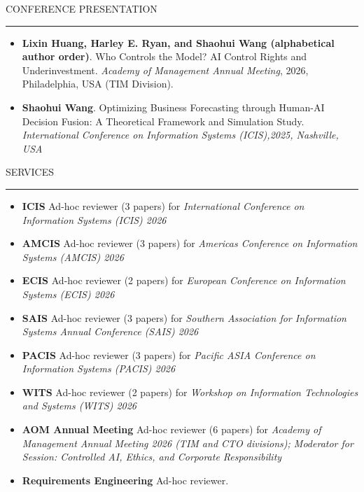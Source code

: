 \documentclass{resume}
\renewenvironment{rSection}[1]{
\Needspace{5\baselineskip}
\sectionskip
\textcolor{RoyalPurple}{\MakeUppercase{#1}}
\sectionlineskip
\hrule
\begin{list}{}{
\setlength{\leftmargin}{1.5em}
}
\item[]
}{
\end{list}
}
\begin{document}
\begin{rSection}{CONFERENCE PRESENTATION}
\begin{itemize}[leftmargin=0.7em]
    \item \textbf{Lixin Huang, Harley E. Ryan, and Shaohui Wang (alphabetical author order)}. Who Controls the Model? AI Control Rights and Underinvestment. \textit{Academy of Management Annual Meeting}, 2026, Philadelphia, USA (TIM Division).
    \item \textbf{Shaohui Wang}. Optimizing Business
Forecasting through Human-AI Decision Fusion: A Theoretical Framework and Simulation Study. \textit{International Conference on Information Systems (ICIS),2025, Nashville, USA}
\end{itemize}
\end{rSection}

\begin{rSection}{Services}
\begin{itemize}[leftmargin=0.7em]
    \item \textbf{ICIS} Ad-hoc reviewer (3 papers) for \textit{International Conference on Information Systems (ICIS) 2026}
    \item \textbf{AMCIS} Ad-hoc reviewer  (3 papers) for \textit{Americas Conference on Information Systems (AMCIS) 2026}
    \item \textbf{ECIS} Ad-hoc reviewer  (2 papers) for \textit{European Conference on Information Systems (ECIS) 2026}
    \item \textbf{SAIS} Ad-hoc reviewer  (3 papers) for \textit{Southern Association for Information Systems Annual Conference (SAIS) 2026}
    \item \textbf{PACIS} Ad-hoc reviewer  (3 papers) for \textit{Pacific ASIA Conference on Information Systems (PACIS) 2026}
    \item \textbf{WITS} Ad-hoc reviewer (2 papers) for \textit{Workshop on Information Technologies and Systems (WITS) 2026}
    \item \textbf{AOM Annual Meeting} Ad-hoc reviewer (6 papers) for \textit{Academy of Management Annual Meeting 2026 (TIM and CTO divisions); Moderator for Session: Controlled AI, Ethics, and Corporate Responsibility}
    \item \textbf{Requirements Engineering} Ad-hoc reviewer.
\end{itemize}
\end{rSection}
\end{document}
